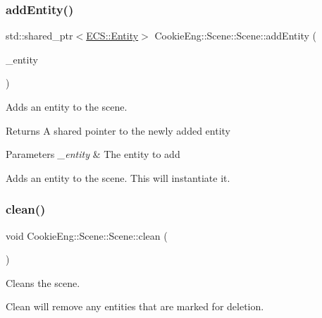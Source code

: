 \subsubsection{\texorpdfstring{add\+Entity()}{addEntity()}}
{\footnotesize\ttfamily std\+::shared\+\_\+ptr$<$\hyperlink{class_cookie_eng_1_1_e_c_s_1_1_entity}{E\+C\+S\+::\+Entity}$>$ Cookie\+Eng\+::\+Scene\+::\+Scene\+::add\+Entity (\begin{DoxyParamCaption}\item[{\hyperlink{class_cookie_eng_1_1_e_c_s_1_1_entity}{E\+C\+S\+::\+Entity} \&}]{\+\_\+entity }\end{DoxyParamCaption})}



Adds an entity to the scene. 

\begin{DoxyReturn}{Returns}
A shared pointer to the newly added entity 
\end{DoxyReturn}

\begin{DoxyParams}{Parameters}
{\em \+\_\+entity} & The entity to add\\
\hline
\end{DoxyParams}
Adds an entity to the scene. This will instantiate it. \mbox{\label{class_cookie_eng_1_1_scene_1_1_scene_a3e1fa17bfd8e0e3af72db05c7a5ae0b3}} 
\subsubsection{\texorpdfstring{clean()}{clean()}}
{\footnotesize\ttfamily void Cookie\+Eng\+::\+Scene\+::\+Scene\+::clean (\begin{DoxyParamCaption}{ }\end{DoxyParamCaption})}



Cleans the scene. 

Clean will remove any entities that are marked for deletion. \mbox{\label{class_cookie_eng_1_1_scene_1_1_scene_a94dbc42f8c5b2f7774d8e0de1f5e45a7}} 
